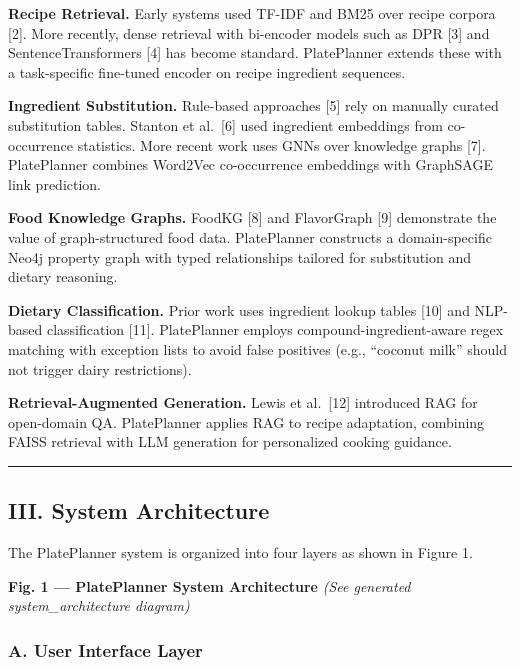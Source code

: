 \documentclass[
  10pt,
]{article}
\begin{document}
\textbf{Recipe Retrieval.} Early systems used TF-IDF and BM25 over
recipe corpora {[}2{]}. More recently, dense retrieval with bi-encoder
models such as DPR {[}3{]} and SentenceTransformers {[}4{]} has become
standard. PlatePlanner extends these with a task-specific fine-tuned
encoder on recipe ingredient sequences.

\textbf{Ingredient Substitution.} Rule-based approaches {[}5{]} rely on
manually curated substitution tables. Stanton et al.~{[}6{]} used
ingredient embeddings from co-occurrence statistics. More recent work
uses GNNs over knowledge graphs {[}7{]}. PlatePlanner combines Word2Vec
co-occurrence embeddings with GraphSAGE link prediction.

\textbf{Food Knowledge Graphs.} FoodKG {[}8{]} and FlavorGraph {[}9{]}
demonstrate the value of graph-structured food data. PlatePlanner
constructs a domain-specific Neo4j property graph with typed
relationships tailored for substitution and dietary reasoning.

\textbf{Dietary Classification.} Prior work uses ingredient lookup
tables {[}10{]} and NLP-based classification {[}11{]}. PlatePlanner
employs compound-ingredient-aware regex matching with exception lists to
avoid false positives (e.g., ``coconut milk'' should not trigger dairy
restrictions).

\textbf{Retrieval-Augmented Generation.} Lewis et al.~{[}12{]}
introduced RAG for open-domain QA. PlatePlanner applies RAG to recipe
adaptation, combining FAISS retrieval with LLM generation for
personalized cooking guidance.

\begin{center}\rule{0.5\linewidth}{0.5pt}\end{center}

\subsection{III. System Architecture}\label{iii.-system-architecture}

The PlatePlanner system is organized into four layers as shown in Figure
1.

\textbf{Fig. 1 --- PlatePlanner System Architecture} \emph{(See
generated system\_architecture diagram)}

\subsubsection{A. User Interface Layer}\label{a.-user-interface-layer}
\end{document}
